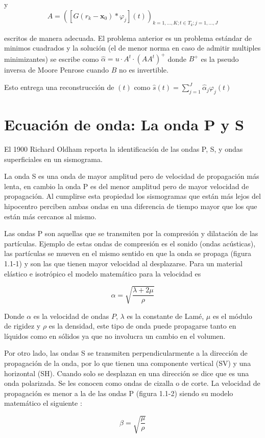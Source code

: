 y
$$A=\left(\left[G\left(r_{k}-\mathbf{x}_{0}\right)\ast\varphi_{j}\right]\left(t\right)\right)_{k=1,\ldots,K;t\in
T_{k};j=1,\ldots,J}$$
 

escritos de manera adecuada. El problema anterior es un problema estándar de
minimos cuadrados  y la solución (el de menor norma en caso de admitir multiples
minimizantes)  se escribe como $\hat{\alpha}=u\cdot
A^{t}\cdot\left(AA^{t}\right)^{+}$ donde $B^{+}$ es la pseudo inversa de Moore
Penrose cuando $B$ no es invertible.

Esto entrega una reconstrucción de $\left(t\right)$ como
$\hat{s}\left(t\right)=\sum_{j=1}^{J}\hat{\alpha}_{j}\varphi_{j}\left(t\right)$


\section{Ecuación de onda: La onda P y S}

El 1900 Richard Oldham reporta la identificación de las ondas P, S, y ondas
superficiales en un sismograma. 

La onda S es una onda de mayor amplitud pero de velocidad de propagación más
lenta, en cambio la onda P es del menor amplitud pero de mayor velocidad de
propagación. Al cumplirse esta propiedad los sismogramas que están más lejos del
hipocentro perciben ambas ondas en una diferencia de tiempo mayor que los que
están más cercanos al mismo.

Las ondas P son aquellas que se transmiten por la compresión y dilatación de las
partículas. Ejemplo de estas ondas de compresión es el sonido (ondas acústicas),
las partículas se mueven en el mismo sentido en que la onda se propaga (figura
1.1-1) y son las que tienen mayor velocidad al desplazarse. Para un material
elástico e isotrópico el modelo matemático para la velocidad es \cite{stein2009introduction}

$$\alpha = \sqrt{\frac{\lambda + 2\mu}{\rho}}$$

Donde $\alpha$ es la velocidad de ondas $P$, $\lambda$ es la constante de Lamé,
$\mu$ es el módulo de rigidez y $\rho$ es la densidad, este tipo de onda puede
propagarse tanto en líquidos como en sólidos ya que no involucra un cambio en el volumen.

Por otro lado, las ondas S se transmiten perpendicularmente a la dirección de
propagación de la onda, por lo que tienen una componente vertical (SV) y una
horizontal (SH). Cuando solo se desplazan en una dirección se dice que es una
onda polarizada. Se les conocen como ondas de cizalla o de corte. La velocidad
de propagación es menor a la de las ondas P (figura 1.1-2) siendo su modelo
matemático el siguiente \cite{stein2009introduction}:

$$\beta = \sqrt{\frac{\mu}{\rho}}$$